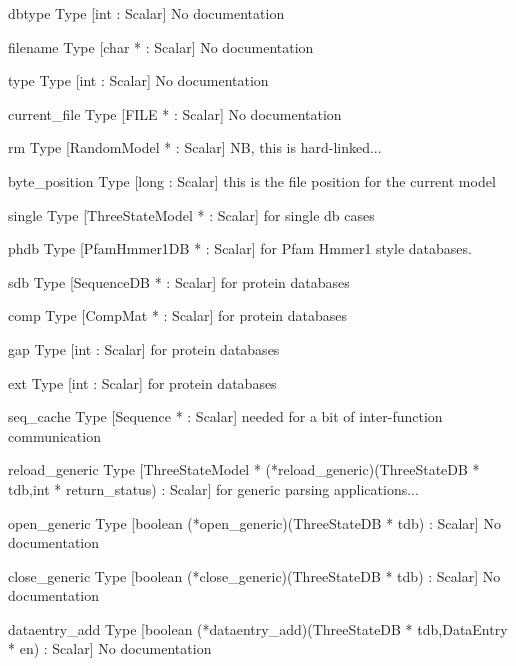 \begin{description}
\item{dbtype} Type [int : Scalar] No documentation

\item{filename} Type [char * : Scalar] No documentation

\item{type} Type [int : Scalar] No documentation

\item{current_file} Type [FILE * : Scalar] No documentation

\item{rm} Type [RandomModel * : Scalar]  NB, this is hard-linked... 

\item{byte_position} Type [long : Scalar]  this is the file position for the current model

\item{single} Type [ThreeStateModel * : Scalar]  for single db cases

\item{phdb} Type [PfamHmmer1DB * : Scalar]  for Pfam Hmmer1 style databases.

\item{sdb} Type [SequenceDB   * : Scalar]  for protein databases

\item{comp} Type [CompMat      * : Scalar]  for protein databases

\item{gap} Type [int : Scalar]  for protein databases

\item{ext} Type [int : Scalar]  for protein databases

\item{seq_cache} Type [Sequence *  : Scalar]  needed for a bit of inter-function communication 

\item{reload_generic} Type [ThreeStateModel * (*reload_generic)(ThreeStateDB * tdb,int * return_status) : Scalar]  for generic parsing applications...


\item{open_generic} Type [boolean (*open_generic)(ThreeStateDB * tdb) : Scalar] No documentation

\item{close_generic} Type [boolean (*close_generic)(ThreeStateDB * tdb) : Scalar] No documentation

\item{dataentry_add} Type [boolean (*dataentry_add)(ThreeStateDB * tdb,DataEntry * en) : Scalar] No documentation


\end{description}
